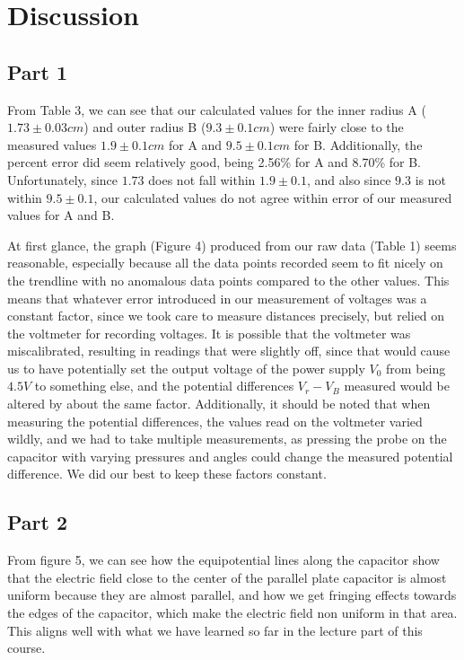 \documentclass[letterpaper]{article}
\begin{document}
\section{Discussion}

\subsection{Part 1}
From Table 3, we can see that our calculated values for the inner radius A
($1.73 \pm 0.03 cm$)
and outer radius B
($9.3 \pm 0.1 cm$) were fairly close to the measured values $1.9 \pm 0.1 cm$ for A
and $ 9.5 \pm 0.1 cm$ for B.
Additionally, the percent error did seem relatively good, being 2.56\% for A and 8.70\% for B.
Unfortunately, since $1.73$ does not fall within $1.9 \pm 0.1$,
and also since $9.3$ is not within $9.5 \pm 0.1$, our calculated values do not
agree within error of our measured values for A and B.

At first glance, the graph (Figure 4) produced from our raw data (Table 1) seems reasonable, especially
because all the data points recorded seem to fit nicely on the trendline with
no anomalous data points compared to the other values. This means that whatever error
introduced in our measurement of voltages was a constant factor, since we took care
to measure distances precisely, but relied on the voltmeter for recording voltages.
It is possible that the voltmeter was miscalibrated, resulting in readings that were slightly off,
since that would cause us to have potentially set the output voltage of the power supply $V_0$ from being $4.5 V$ to something else,
and the potential differences $V_r-V_B$ measured would be altered by about the same factor. Additionally,
it should be noted that when measuring the potential differences, the values read on the voltmeter varied
wildly, and we had to take multiple measurements, as pressing the probe on the capacitor with varying pressures and
angles could change the measured potential difference. We did our best to keep these factors constant.

\subsection{Part 2}
From figure 5, we can see how the equipotential lines along the capacitor show that the
electric field close to the center of the parallel plate capacitor is almost uniform because they are almost parallel, and
how we get fringing effects towards the edges of the capacitor, which make the electric field non uniform
in that area. This aligns well with what we have learned so far in the lecture part of this course.
\end{document}
